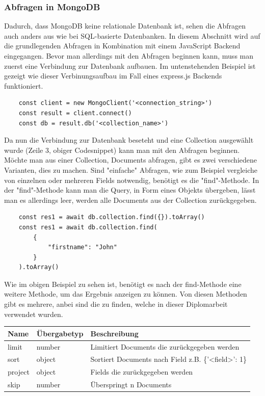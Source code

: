 \subsubsection{Abfragen in MongoDB}
Dadurch, dass MongoDB keine relationale Datenbank ist, sehen die Abfragen auch anders aus wie bei SQL-basierte Datenbanken. In diesem Abschnitt wird auf die grundlegenden Abfragen in Kombination mit einem JavaScript Backend eingegangen. Bevor man allerdings mit den Abfragen beginnen kann, muss man zuerst eine Verbindung zur Datenbank aufbauen. Im untenstehenden Beispiel ist gezeigt wie dieser Verbinungsaufbau im Fall eines express.js Backends funktioniert.
\begin{lstlisting}
    const client = new MongoClient('<connection_string>')
    const result = client.connect()
    const db = result.db('<collection_name>')
\end{lstlisting}
Da nun die Verbindung zur Datenbank beseteht und eine Collection ausgewählt wurde (Zeile 3, obiger Codesnippet) kann man mit den Abfragen beginnen.
\newline
Möchte man aus einer Collection, Documents abfragen, gibt es zwei verschiedene Varianten, dies zu machen. Sind "einfache" Abfragen, wie zum Beispiel vergleiche von einzelnen oder mehreren Fields notwendig, benötigt es die "find"-Methode. In der "find"-Methode kann man die Query, in Form eines Objekts übergeben, lässt man es allerdings leer, werden alle Documents aus der Collection zurückgegeben.
\begin{lstlisting}
    const res1 = await db.collection.find({}).toArray()
    const res1 = await db.collection.find(
        {
            "firstname": "John"
        }
    ).toArray()
\end{lstlisting}
Wie im obigen Beispiel zu sehen ist, benötigt es nach der find-Methode eine weitere Methode, um das Ergebnis anzeigen zu können. Von diesen Methoden gibt es mehrere, anbei sind die zu finden, welche in dieser Diplomarbeit verwendet wurden.
\begin{center}
    \begin{tabular}{ | m{3cm} | m{2.3cm}| m{8cm} | } 
        \hline
        Name & Übergabetyp & Beschreibung \\ [0.5ex] 
        \hline\hline
        limit & number & Limitiert Documents die zurückgegeben werden \\
        \hline
        sort & object & Sortiert Documents nach Field z.B. \{'<field>': 1\} \\
        \hline
        project & object & Fields die zurückgegeben werden \\
        \hline
        skip & number & Überspringt n Documents \\
        \hline
    \end{tabular}
\end{center}
